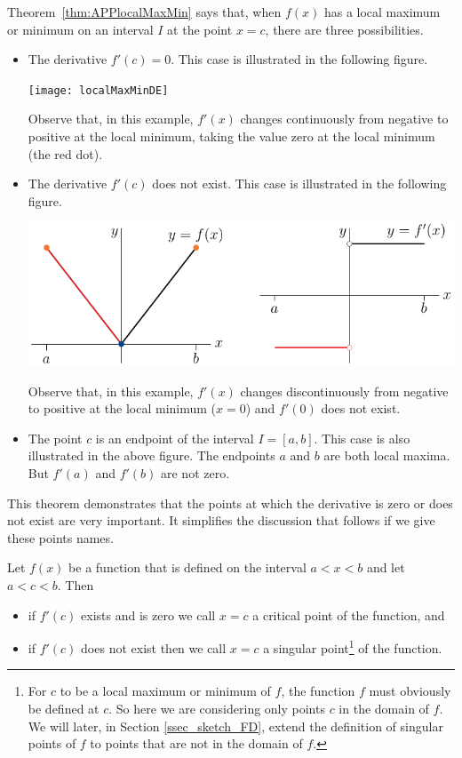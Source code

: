 Theorem~\ref{thm:APPlocalMaxMin} says that, when $f(x)$ has a local maximum or
minimum on an interval $I$ at the point $x=c$, there are three possibilities.
\begin{itemize}
 \item The derivative $f'(c)=0$. This case is illustrated in the following
figure.
\begin{efig}
 \begin{center}
  \texttt{[image: localMaxMinDE]}
 \end{center}
\end{efig}
Observe that, in this example, $f'(x)$ changes continuously from negative to
positive at the local minimum, taking the value zero at the local minimum (the
red dot).

\item The derivative $f'(c)$ does not exist. This case is illustrated in the
following figure.
\begin{efig}
 \begin{center}
  \includegraphics[]{localMaxMinFGP}
 \end{center}
\end{efig}
Observe that, in this example, $f'(x)$ changes discontinuously from negative to
positive at the local minimum ($x=0$) and $f'(0)$ does not exist.

\item 
The point $c$ is an endpoint of the interval $I=[a,b]$. This case is also 
illustrated in the above figure. The endpoints $a$ and $b$ are both local maxima. But $f'(a)$ and $f'(b)$ are not zero.
\end{itemize}
This theorem demonstrates that the points at which the derivative is zero or
does not exist are very important. It simplifies the discussion that follows if
we give these points names.
\begin{defn}\label{def:APPcriticalPoint} %
Let $f(x)$ be a function that is defined on the interval $a<x<b$ and let $a<c<b$. Then
\begin{itemize}
 \item if $f'(c)$ exists and is zero we call $x=c$ a critical point of the
function, and
 \item if $f'(c)$ does not exist then we call $x=c$ a 
singular point\footnote{For $c$ to be a local maximum or minimum of $f$, the function $f$ must obviously be defined at $c$. So here we are 
considering only points $c$ in the domain of $f$. We will later,
in Section \ref{ssec_sketch_FD}, extend the definition of singular points
of $f$ to points that are not in the domain of $f$.} of the function.
\end{itemize}
\end{defn}

